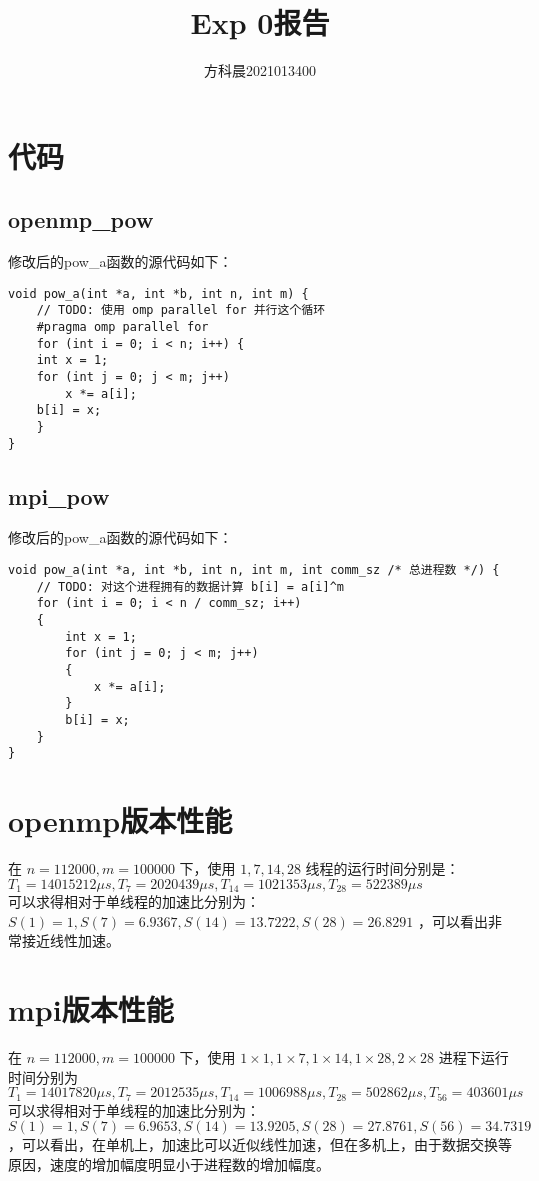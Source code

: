 \documentclass[UTF8,12pt]{article}
\begin{document}
\title{\bf{Exp 0报告}}
\author{方科晨\hspace{1cm}2021013400}
\date{}
\maketitle


\section{代码}
\subsection{openmp\_pow}
修改后的pow\_a函数的源代码如下：
{\setmainfont{Courier New Bold}
  \begin{lstlisting}
void pow_a(int *a, int *b, int n, int m) {
    // TODO: 使用 omp parallel for 并行这个循环
	#pragma omp parallel for
    for (int i = 0; i < n; i++) {
	int x = 1;
	for (int j = 0; j < m; j++)
	    x *= a[i];
	b[i] = x;
    }
}
  \end{lstlisting}
}

\subsection{mpi\_pow}
修改后的pow\_a函数的源代码如下：
{\setmainfont{Courier New Bold}
  \begin{lstlisting}
void pow_a(int *a, int *b, int n, int m, int comm_sz /* 总进程数 */) {
    // TODO: 对这个进程拥有的数据计算 b[i] = a[i]^m
	for (int i = 0; i < n / comm_sz; i++)
	{
		int x = 1;
		for (int j = 0; j < m; j++)
		{
			x *= a[i];
		}
		b[i] = x;
	}
}
  \end{lstlisting}
}
\section{openmp版本性能}
在 $n=112000,m=100000$ 下，使用 $1,7,14,28$ 线程的运行时间分别是： $T_1=14015212 \mu s,T_7=2020439 \mu s,T_{14}=1021353 \mu s,T_{28}=522389 \mu s$\\
可以求得相对于单线程的加速比分别为： $S(1)=1,S(7)=6.9367,S(14)=13.7222,S(28)=26.8291$ ，可以看出非常接近线性加速。

\section{mpi版本性能}
在 $n=112000,m=100000$ 下，使用 $1\times 1, 1\times 7, 1\times 14, 1\times 28, 2\times 28$ 进程下运行时间分别为 $T_1=14017820 \mu s,T_7=2012535 \mu s,T_{14}=1006988 \mu s,T_{28}=502862 \mu s,T_{56}=403601 \mu s$\\
可以求得相对于单线程的加速比分别为： $S(1)=1,S(7)=6.9653,S(14)=13.9205,S(28)=27.8761,S(56)=34.7319$ ，可以看出，在单机上，加速比可以近似线性加速，但在多机上，由于数据交换等原因，速度的增加幅度明显小于进程数的增加幅度。
\end{document}
